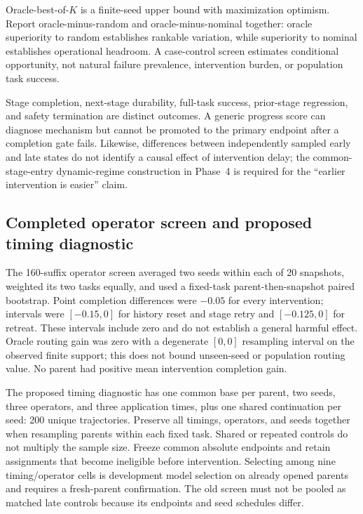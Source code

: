Oracle-best-of-$K$ is a finite-seed upper bound with maximization optimism. Report oracle-minus-random and oracle-minus-nominal together: oracle superiority to random establishes rankable variation, while superiority to nominal establishes operational headroom. A case-control screen estimates conditional opportunity, not natural failure prevalence, intervention burden, or population task success.

Stage completion, next-stage durability, full-task success, prior-stage regression, and safety termination are distinct outcomes. A generic progress score can diagnose mechanism but cannot be promoted to the primary endpoint after a completion gate fails. Likewise, differences between independently sampled early and late states do not identify a causal effect of intervention delay; the common-stage-entry dynamic-regime construction in Phase~4 is required for the ``earlier intervention is easier'' claim.

\subsection{Completed operator screen and proposed timing diagnostic}

The 160-suffix operator screen averaged two seeds within each of 20 snapshots, weighted its two tasks equally, and used a fixed-task parent-then-snapshot paired bootstrap. Point completion differences were $-0.05$ for every intervention; intervals were $[-0.15,0]$ for history reset and stage retry and $[-0.125,0]$ for retreat. These intervals include zero and do not establish a general harmful effect. Oracle routing gain was zero with a degenerate $[0,0]$ resampling interval on the observed finite support; this does not bound unseen-seed or population routing value. No parent had positive mean intervention completion gain.

The proposed timing diagnostic has one common base per parent, two seeds, three operators, and three application times, plus one shared continuation per seed: 200 unique trajectories. Preserve all timings, operators, and seeds together when resampling parents within each fixed task. Shared or repeated controls do not multiply the sample size. Freeze common absolute endpoints and retain assignments that become ineligible before intervention. Selecting among nine timing/operator cells is development model selection on already opened parents and requires a fresh-parent confirmation. The old screen must not be pooled as matched late controls because its endpoints and seed schedules differ.

